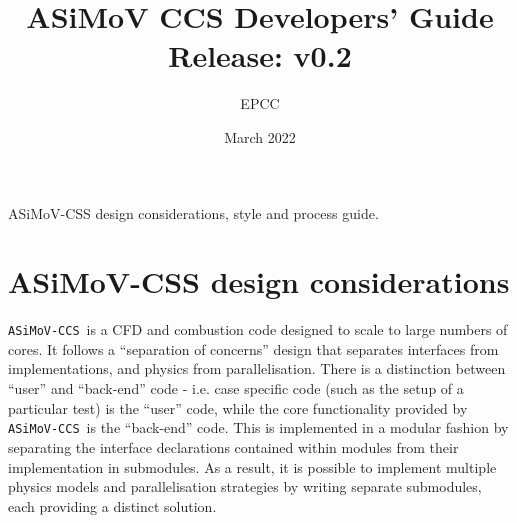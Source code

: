 \documentclass[11pt]{report}
\newcommand{\accs}{\texttt{ASiMoV-CCS}}
\begin{document}
\lstset{style=codefragment}


\title{ASiMoV CCS Developers' Guide\\\small{Release: v0.2}}

\date{March 2022}
\author{EPCC}

\makeEPCCtitle

\centerline{\sc ASiMoV-CSS design considerations, style and process guide.}

\tableofcontents
\pagebreak

\bigskip


\bigskip

\chapter{ASiMoV-CSS design considerations}
\accs\ is a CFD and combustion code designed to scale to large numbers of cores. It follows a ``separation of concerns'' design that separates interfaces from implementations, and physics from parallelisation. There is a distinction between ``user'' and ``back-end'' code - i.e. case specific code (such as the setup of a particular test) is the ``user'' code, while the core functionality provided by \accs\ is the ``back-end'' code. This is implemented in a modular fashion by separating the interface declarations contained within modules from their implementation in submodules. As a result, it is possible to implement multiple physics models and parallelisation strategies by writing separate submodules, each providing a distinct solution. 
\end{document}
